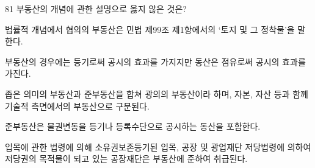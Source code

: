 \begin{question}{81}
부동산의 개념에 관한 설명으로 옳지 않은 것은?
\begin{choices}
  \item 법률적 개념에서 협의의 부동산은 민법 제99조 제1항에서의 ‘토지 및 그 정착물’을 말한다.
  \item 부동산의 경우에는 등기로써 공시의 효과를 가지지만 동산은 점유로써 공시의 효과를 가진다.
  \item 좁은 의미의 부동산과 준부동산을 합쳐 광의의 부동산이라 하며, 자본, 자산 등과 함께 기술적 측면에서의 부동산으로 구분된다.
  \item 준부동산은 물권변동을 등기나 등록수단으로 공시하는 동산을 포함한다.
  \item 입목에 관한 법령에 의해 소유권보존등기된 입목, 공장 및 광업재단 저당법령에 의하여 저당권의 목적물이 되고 있는 공장재단은 부동산에 준하여 취급된다.
\end{choices}
\end{question}
